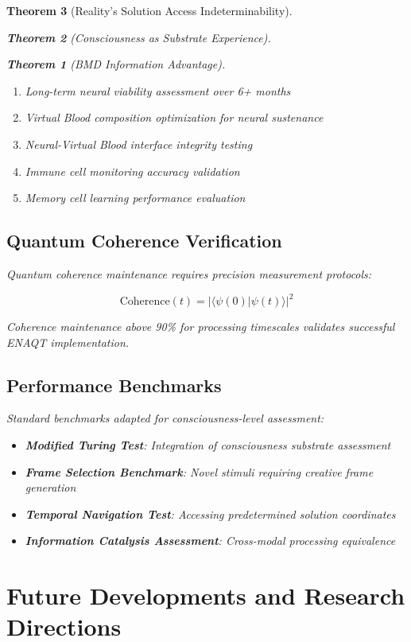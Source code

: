 \documentclass[12pt,a4paper]{article}
\newtheorem{theorem}{Theorem}[section]
\theoremstyle{remark}
\begin{document}
\begin{theorem}[Reality's Solution Access Indeterminability]
\begin{theorem}[Consciousness as Substrate Experience]
\begin{theorem}[BMD Information Advantage]
{{{\begin{enumerate}
\item Long-term neural viability assessment over 6+ months
\item Virtual Blood composition optimization for neural sustenance
\item Neural-Virtual Blood interface integrity testing
\item Immune cell monitoring accuracy validation
\item Memory cell learning performance evaluation
\end{enumerate}

\subsection{Quantum Coherence Verification}

Quantum coherence maintenance requires precision measurement protocols:

\begin{equation}
\text{Coherence}(t) = |\langle\psi(0)|\psi(t)\rangle|^2
\end{equation}

Coherence maintenance above 90\% for processing timescales validates successful ENAQT implementation.

\subsection{Performance Benchmarks}

Standard benchmarks adapted for consciousness-level assessment:

\begin{itemize}
\item \textbf{Modified Turing Test}: Integration of consciousness substrate assessment
\item \textbf{Frame Selection Benchmark}: Novel stimuli requiring creative frame generation
\item \textbf{Temporal Navigation Test}: Accessing predetermined solution coordinates
\item \textbf{Information Catalysis Assessment}: Cross-modal processing equivalence
\end{itemize}

\section{Future Developments and Research Directions}

}}}
\end{theorem}
\end{theorem}
\end{theorem}
\end{document}
